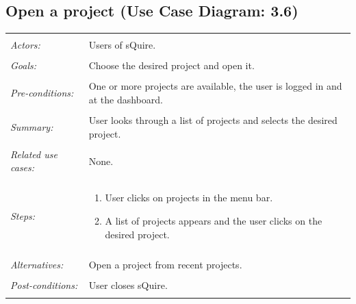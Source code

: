 \documentclass[11pt]{report}
\begin{document}
\subsection{Open a project (Use Case Diagram: 3.6)}
\begin{tabular}{ p{2cm} p{12cm} }
 \hline
 \\
 \textit{Actors:} & Users of sQuire. \\ 
 \\
 \textit{Goals:} & Choose the desired project and open it. \\
 \\
 \textit{Pre-conditions:} & One or more projects are available, the user is logged in and at the dashboard. \\
 \\
 \textit{Summary:} & User looks through a list of projects and selects the desired project. \\ 
 \\
 \textit{Related use cases:} & None. \\ 
 \\
 \textit{Steps:} & \begin{enumerate}
  \item User clicks on projects in the menu bar.
  \item A list of projects appears and the user clicks on the desired project.
 \end{enumerate} \\
 \\
 \textit{Alternatives:} & Open a project from recent projects. \\
 \\
 \textit{Post-conditions:} & User closes sQuire. \\
 \\
\hline
\end{tabular}
\end{document}
